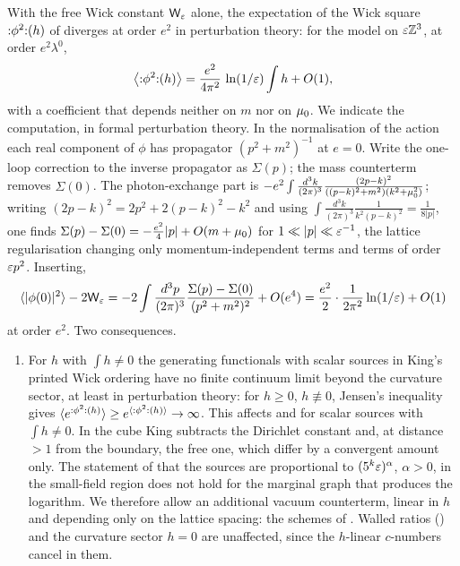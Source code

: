 \begin{remark}\label{rot:rem:log}
With the free Wick constant $\mathsf W_{\varepsilon}$ alone, the expectation of the Wick square ${:}\phi^2{:}(h)$ of  diverges at order $e^2$ in perturbation theory: for the model on $\varepsilon\mathbb Z^3$, at order $e^2\lambda^0$,
\[
\big\langle{:}\phi^2{:}(h)\big\rangle=\frac{e^2}{4\pi^2}\,\ln(1/\varepsilon)\int h+O(1),
\]
with a coefficient that depends neither on $m$ nor on $\mu_0$. We indicate the computation, in formal perturbation theory. In the normalisation of the action each real component of $\phi$ has propagator $(p^2+m^2)^{-1}$ at $e=0$. Write the one-loop correction to the inverse propagator as $\Sigma(p)$; the mass counterterm removes $\Sigma(0)$. The photon-exchange part is $-e^2\int\frac{d^3k}{(2\pi)^3}\frac{(2p-k)^2}{((p-k)^2+m^2)(k^2+\mu_0^2)}$; writing $(2p-k)^2=2p^2+2(p-k)^2-k^2$ and using $\int\frac{d^3k}{(2\pi)^3}\frac1{k^2(p-k)^2}=\frac1{8|p|}$, one finds $\Sigma(p)-\Sigma(0)=-\frac{e^2}4|p|+O(m+\mu_0)$ for $1\ll|p|\ll\varepsilon^{-1}$, the lattice regularisation changing only momentum-independent terms and terms of order $\varepsilon p^2$. Inserting,
\[
\langle|\phi(0)|^2\rangle-2\mathsf W_{\varepsilon}=-2\int\frac{d^3p}{(2\pi)^3}\frac{\Sigma(p)-\Sigma(0)}{(p^2+m^2)^2}+O(e^4)=\frac{e^2}2\cdot\frac1{2\pi^2}\ln(1/\varepsilon)+O(1)
\]
at order $e^2$. Two consequences.
\begin{enumerate}[label=\textup{(\alph*)},leftmargin=*]
\item For $h$ with $\int h\ne0$ the generating functionals with scalar sources in King's printed Wick ordering have no finite continuum limit beyond the curvature sector, at least in perturbation theory: for $h\ge0$, $h\not\equiv0$, Jensen's inequality gives $\langle e^{{:}\phi^2{:}(h)}\rangle\ge e^{\langle{:}\phi^2{:}(h)\rangle}\to\infty$. This affects \cite[Thm.~2.1]{K1} and \cite[Thms.~2.1--2.3, (3.43), (4.2)]{K2} for scalar sources with $\int h\ne0$. In the cube King subtracts the Dirichlet constant \cite[(2.13)]{K2} and, at distance $>1$ from the boundary, the free one, which differ by a convergent amount only. The statement of \cite[p.~677]{K1} that the sources are proportional to $(5^k\varepsilon)^\alpha$, $\alpha>0$, in the small-field region does not hold for the marginal graph that produces the logarithm. We therefore allow an additional vacuum counterterm, linear in $h$ and depending only on the lattice spacing: the schemes of . Walled ratios () and the curvature sector $h=0$ are unaffected, since the $h$-linear $c$-numbers cancel in them.

\end{enumerate}
\end{remark}
